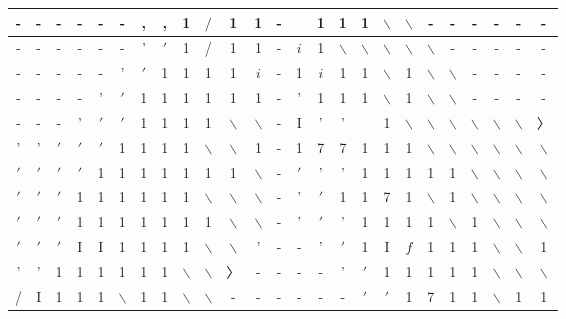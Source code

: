 \documentclass[10pt]{article}
\begin{document}
\begin{center}
\begin{tabular}{|c|c|c|c|c|c|c|c|c|c|c|c|c|c|c|c|c|c|c|c|c|c|c|c|c|}
\hline
- & - & - & - & - & - & , & , & 1 & $/$ & 1 & 1 & - &  & 1 & 1 & 1 & $\backslash$ & $\backslash$ & - & - & - & - & - & - \\
\hline
- & - & - & - & - & - & ' & $\prime$ & 1 & / & 1 & 1 & - & $i$ & 1 & $\backslash$ & $\backslash$ & $\backslash$ & $\backslash$ & $\backslash$ & - & - & - & - & - \\
\hline
- & - & - & - & - & ' & $\prime$ & 1 & 1 & 1 & 1 & $i$ & - & 1 & $i$ & 1 & 1 & $\backslash$ & 1 & $\backslash$ & $\backslash$ & - & - & - & - \\
\hline
- & - & - & - & ' & $\prime$ & 1 & 1 & 1 & 1 & 1 & 1 & - & ' & 1 & 1 & 1 & $\backslash$ & 1 & $\backslash$ & $\backslash$ & - & - & - & - \\
\hline
- & - & - & ' & $\prime$ & $\prime$ & 1 & 1 & 1 & 1 & $\backslash$ & $\backslash$ & - & I & ' & ' &  & 1 & $\backslash$ & $\backslash$ & $\backslash$ & $\backslash$ & $\backslash$ & $\backslash$ & 〉 \\
\hline
' & ' & $\prime$ & $\prime$ & $\prime$ & 1 & 1 & 1 & 1 & $\backslash$ & $\backslash$ & 1 & - & 1 & 7 & 7 & 1 & 1 & 1 & $\backslash$ & $\backslash$ & $\backslash$ & $\backslash$ & $\backslash$ & $\backslash$ \\
\hline
$\prime$ & $\prime$ & $\prime$ & $\prime$ & 1 & 1 & 1 & 1 & 1 & 1 & 1 & $\backslash$ & - & $'$ & ' & ' & 1 & 1 & 1 & 1 & 1 & $\backslash$ & $\backslash$ & $\backslash$ & $\backslash$ \\
\hline
$\prime$ & $\prime$ & $\prime$ & 1 & 1 & 1 & 1 & 1 & 1 & $\backslash$ & $\backslash$ & $\backslash$ & - & ' & $\prime$ & 1 & 1 & 7 & 1 & $\backslash$ & 1 & $\backslash$ & $\backslash$ & $\backslash$ & $\backslash$ \\
\hline
$\prime$ & $\prime$ & $\prime$ & 1 & 1 & 1 & 1 & 1 & 1 & 1 & $\backslash$ & $\backslash$ & - & ' & $'$ & ' & 1 & 1 & 1 & 1 & $\backslash$ & 1 & $\backslash$ & $\backslash$ & $\backslash$ \\
\hline
$\prime$ & $\prime$ & $\prime$ & I & I & 1 & 1 & 1 & 1 & $\backslash$ & $\backslash$ & ' & - & - & ' & $\prime$ & 1 & I & $f$ & 1 & 1 & 1 & $\backslash$ & $\backslash$ & 1 \\
\hline
' & ' & 1 & 1 & 1 & 1 & 1 & 1 & $\backslash$ & $\backslash$ & 〉 & - & - & - & - & ' & $\prime$ & 1 & 1 & 1 & 1 & 1 & $\backslash$ & $\backslash$ & $\backslash$ \\
\hline
/ & I & 1 & 1 & 1 & $\backslash$ & 1 & 1 & $\backslash$ & $\backslash$ & - & - & - & - & - & - & $\prime$ & $\prime$ & 1 & 7 & 1 & 1 & $\backslash$ & 1 & 1 \\
\hline
\end{tabular}
\end{center}
\end{document}

